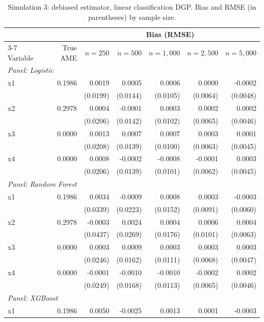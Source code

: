 \begin{table}[htbp]
\centering
\small
\begin{threeparttable}
\caption{Simulation 3: debiased estimator, linear classification DGP. Bias and RMSE (in parentheses) by sample size.}
\label{tab:sim3_bias_classification_linear}
\begin{tabular}{lrrrrrr}
\toprule
 & & \multicolumn{5}{c}{Bias (RMSE)} \\
\cmidrule(lr){3-7}
Variable & True AME & $n=250$ & $n=500$ & $n=1,000$ & $n=2,500$ & $n=5,000$ \\
\midrule
\multicolumn{7}{l}{\textit{Panel: Logistic}} \\
\quad x1 & 0.1986 & 0.0019 & 0.0005 & 0.0006 & 0.0000 & -0.0002 \\
 &  & (0.0199) & (0.0144) & (0.0105) & (0.0064) & (0.0048) \\
\quad x2 & 0.2978 & 0.0004 & -0.0001 & 0.0003 & 0.0002 & 0.0002 \\
 &  & (0.0206) & (0.0142) & (0.0102) & (0.0065) & (0.0046) \\
\quad x3 & 0.0000 & 0.0013 & 0.0007 & 0.0007 & 0.0003 & 0.0001 \\
 &  & (0.0208) & (0.0139) & (0.0100) & (0.0063) & (0.0045) \\
\quad x4 & 0.0000 & 0.0008 & -0.0002 & -0.0008 & -0.0001 & 0.0003 \\
 &  & (0.0206) & (0.0139) & (0.0101) & (0.0062) & (0.0045) \\
\midrule
\multicolumn{7}{l}{\textit{Panel: Random Forest}} \\
\quad x1 & 0.1986 & 0.0034 & -0.0009 & 0.0008 & 0.0003 & -0.0003 \\
 &  & (0.0339) & (0.0223) & (0.0152) & (0.0091) & (0.0060) \\
\quad x2 & 0.2978 & -0.0003 & 0.0024 & 0.0004 & 0.0006 & 0.0004 \\
 &  & (0.0437) & (0.0269) & (0.0176) & (0.0101) & (0.0063) \\
\quad x3 & 0.0000 & 0.0003 & 0.0009 & 0.0003 & 0.0003 & 0.0003 \\
 &  & (0.0246) & (0.0162) & (0.0111) & (0.0068) & (0.0047) \\
\quad x4 & 0.0000 & -0.0001 & -0.0010 & -0.0010 & -0.0002 & 0.0002 \\
 &  & (0.0249) & (0.0168) & (0.0113) & (0.0065) & (0.0046) \\
\midrule
\multicolumn{7}{l}{\textit{Panel: XGBoost}} \\
\quad x1 & 0.1986 & 0.0050 & -0.0025 & 0.0013 & 0.0001 & -0.0003 \\

\end{tabular}
\end{threeparttable}
\end{table}
